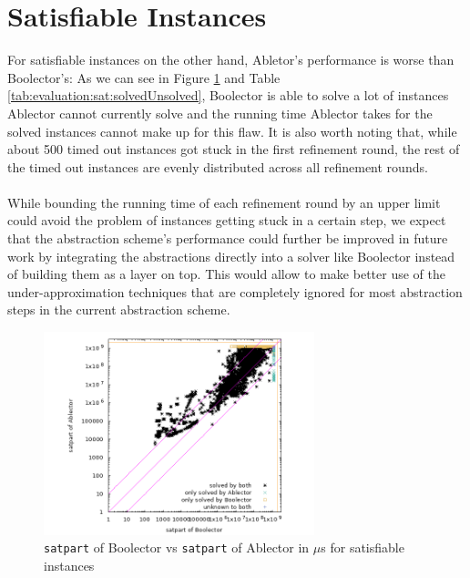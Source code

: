 
\section{Satisfiable Instances}
For satisfiable instances on the other hand, Abletor's performance is worse than Boolector's: As we can see in Figure \ref{fig:evaluation:sat:scatter} and Table \ref{tab:evaluation:sat:solvedUnsolved}, Boolector is able to solve a lot of instances Ablector cannot currently solve and the running time Ablector takes for the solved instances cannot make up for this flaw.
It is also worth noting that, while about 500 timed out instances got stuck in the first refinement round, the rest of the timed out instances are evenly distributed across all refinement rounds.
\paragraph{}
While bounding the running time of each refinement round by an upper limit could avoid the problem of instances getting stuck in a certain step, we expect that the abstraction scheme's performance could further be improved in future work by integrating the abstractions directly into a solver like Boolector instead of building them as a layer on top. This would allow to make better use of the under-approximation techniques that are completely ignored for most abstraction steps in the current abstraction scheme.

\begin{figure}[]
    \centering
        \includegraphics[width=0.7\textwidth]{plots/sat/Boolector-vs-Ablector-satpart.png}
    \caption{\texttt{satpart} of Boolector vs \texttt{satpart} of Ablector in $\mu$s for satisfiable instances}
    \label{fig:evaluation:sat:scatter}
\end{figure}

